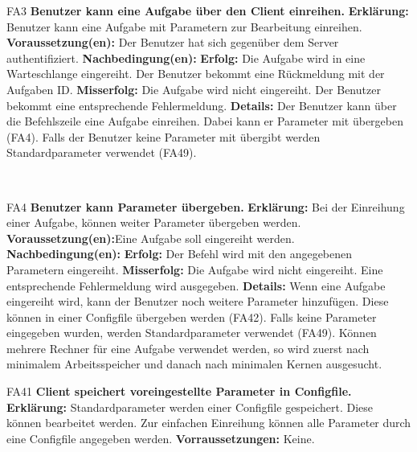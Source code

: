 \documentclass[a4paper,12pt]{article}
\begin{document}
\begin{itemize}[nosep]
    \begin{minipage}[t] {\linewidth}
    	\item[FA3] \textbf{Benutzer kann eine Aufgabe über den \gls{Client} einreihen.}
    	\subitem \textbf{Erklärung:} Benutzer kann eine Aufgabe mit Parametern zur Bearbeitung einreihen.
    	\subitem \textbf{Voraussetzung(en):} Der \gls{Benutzer} hat sich gegenüber dem \gls{Server} authentifiziert.
    	\subitem \textbf{Nachbedingung(en):}
    	\subsubitem \textbf{Erfolg:} Die Aufgabe wird in eine Warteschlange eingereiht. Der \gls{Benutzer} bekommt eine Rückmeldung mit der Aufgaben ID.
    	\subsubitem \textbf{Misserfolg:} Die Aufgabe wird nicht eingereiht. Der Benutzer bekommt eine entsprechende Fehlermeldung.
    	\subitem \textbf{Details:} Der \gls{Benutzer} kann über die \gls{Befehlszeile} eine Aufgabe einreihen. Dabei kann er Parameter mit übergeben (FA4). Falls der Benutzer keine Parameter mit übergibt werden Standardparameter verwendet (FA49).
   \end{minipage}
   \newline
   \\
	
	\begin{minipage}[t]{\linewidth}
		\item[FA4] \textbf{Benutzer kann Parameter übergeben.}
		\subitem \textbf{Erklärung:} Bei der Einreihung einer Aufgabe, können weiter Parameter übergeben werden.
		\subitem \textbf{Voraussetzung(en):}Eine Aufgabe soll eingereiht werden.
		\subitem \textbf{Nachbedingung(en):}
		\subsubitem \textbf{Erfolg:} Der Befehl wird mit den angegebenen Parametern eingereiht.
		\subsubitem \textbf{Misserfolg:} Die Aufgabe wird nicht eingereiht. Eine entsprechende Fehlermeldung wird ausgegeben.
		\subitem \textbf{Details:} Wenn eine Aufgabe eingereiht wird, kann der \gls{Benutzer} noch weitere Parameter hinzufügen. Diese können in einer \gls{Configfile} übergeben werden (FA42). Falls keine Parameter eingegeben wurden, werden Standardparameter verwendet (FA49).
		Können mehrere Rechner für eine Aufgabe verwendet werden, so wird zuerst nach minimalem Arbeitsspeicher und danach nach minimalen Kernen ausgesucht.
	\end{minipage}
	\pagebreak
	
	\begin{minipage}[t]{\linewidth}
		\item[FA41] \textbf{\gls{Client} speichert voreingestellte Parameter in \gls{Configfile}.}
		\subitem \textbf{Erklärung:} Standardparameter werden einer \gls{Configfile} gespeichert.
		Diese können bearbeitet werden. Zur einfachen Einreihung können alle Parameter durch eine \gls{Configfile} angegeben werden.
		\subitem \textbf{Vorraussetzungen:} Keine.
		

\end{minipage}
\end{itemize}
\end{document}

